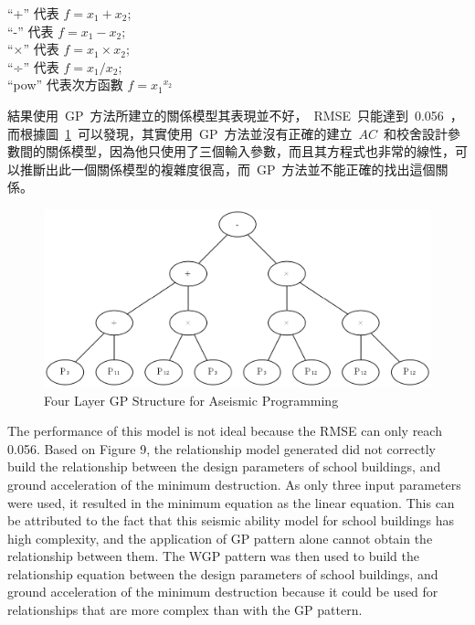 ``+'' 代表 $f = x_1 + x_2$; \\ \indent
``-'' 代表 $f = x_1 - x_2$; \\ \indent
``×'' 代表 $f = x_1 \times x_2$; \\ \indent
``÷'' 代表 $f = x_1 / x_2$; \\ \indent
``pow'' 代表次方函數 $f = {x_1} ^ {x_2}$

結果使用~GP~方法所建立的關係模型其表現並不好，~RMSE~只能達到~0.056~，而根據圖~\ref{fig:4LGP}~可以發現，其實使用~GP~方法並沒有正確的建立~$AC$~和校舍設計參數間的關係模型，因為他只使用了三個輸入參數，而且其方程式也非常的線性，可以推斷出此一個關係模型的複雜度很高，而~GP~方法並不能正確的找出這個關係。

\begin{figure}[hbtp]
  \begin{center}
    \includegraphics[width=1.0\textwidth]{figures/4-layer-gp.png}
    \caption{Four Layer GP Structure for Aseismic Programming} 
    \label{fig:4LGP}
  \end{center}
\end{figure}

The performance of this model is not ideal because the RMSE can only reach 0.056. Based on Figure 9, the relationship model generated did not correctly build the relationship between the design parameters of school buildings, and ground acceleration of the minimum destruction. As only three input parameters were used, it resulted in the minimum equation as the linear equation. This can be attributed to the fact that this seismic ability model for school buildings has high complexity, and the application of GP pattern alone cannot obtain the relationship between them. The WGP pattern was then used to build the relationship equation between the design parameters of school buildings, and ground acceleration of the minimum destruction because it could be used for relationships that are more complex than with the GP pattern.

